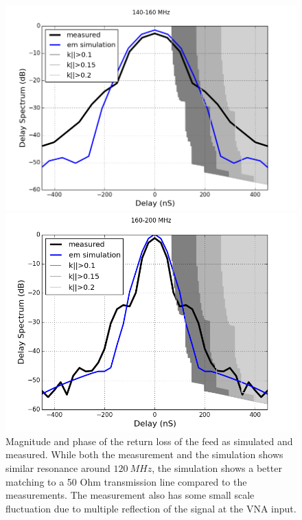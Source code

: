 \documentclass[twocolumn]{emulateapj}
\begin{document}
\begin{figure}[ht]
\begin{minipage}[b]{0.5\linewidth}
\includegraphics[angle=0, width=\linewidth]{GB_reflectometry_part3/plot/140_160.png}
\end{minipage}
\hspace{0.1cm}
\begin{minipage}[b]{0.5\linewidth}
\centering
\includegraphics[angle=0, width=\linewidth]{GB_reflectometry_part3/plot/160_200.png}
\end{minipage}
\caption{Magnitude and phase of the return loss of the feed as simulated and measured. While both the measurement and the simulation shows similar resonance around $120~MHz$, the simulation shows a better matching to a 50 Ohm transmission line compared to the measurements. The measurement also has some small scale fluctuation due to multiple reflection of the signal at the VNA input. }   
\label{ds_full_sub_band}
\end{figure}
\end{document}

